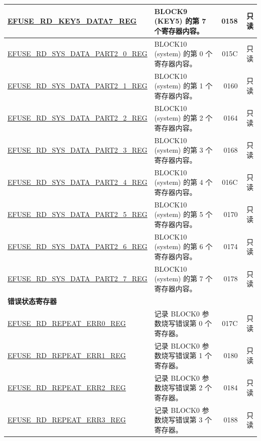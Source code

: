\begin{longtable}{ | m{6cm} |m{7.2cm} | r| r | }
\hyperref[regdesc:EFUSERDKEY5DATANREG]{EFUSE\_RD\_KEY5\_DATA7\_REG} & BLOCK9 (KEY5) 的第 7 个寄存器内容。 & \hexprefix{}0158 & 只读 \\ \hline
\hyperref[regdesc:EFUSERDSYSDATAPART2NREG]{EFUSE\_RD\_SYS\_DATA\_PART2\_0\_REG} & BLOCK10 (system) 的第 0 个寄存器内容。 & \hexprefix{}015C & 只读 \\ \hline
\hyperref[regdesc:EFUSERDSYSDATAPART2NREG]{EFUSE\_RD\_SYS\_DATA\_PART2\_1\_REG} & BLOCK10 (system) 的第 1 个寄存器内容。 & \hexprefix{}0160 & 只读 \\ \hline
\hyperref[regdesc:EFUSERDSYSDATAPART2NREG]{EFUSE\_RD\_SYS\_DATA\_PART2\_2\_REG} & BLOCK10 (system) 的第 2 个寄存器内容。 & \hexprefix{}0164 & 只读 \\ \hline
\hyperref[regdesc:EFUSERDSYSDATAPART2NREG]{EFUSE\_RD\_SYS\_DATA\_PART2\_3\_REG} & BLOCK10 (system) 的第 3 个寄存器内容。 & \hexprefix{}0168 & 只读 \\ \hline
\hyperref[regdesc:EFUSERDSYSDATAPART2NREG]{EFUSE\_RD\_SYS\_DATA\_PART2\_4\_REG} & BLOCK10 (system) 的第 4 个寄存器内容。 & \hexprefix{}016C & 只读 \\ \hline
\hyperref[regdesc:EFUSERDSYSDATAPART2NREG]{EFUSE\_RD\_SYS\_DATA\_PART2\_5\_REG} & BLOCK10 (system) 的第 5 个寄存器内容。 & \hexprefix{}0170 & 只读 \\ \hline
\hyperref[regdesc:EFUSERDSYSDATAPART2NREG]{EFUSE\_RD\_SYS\_DATA\_PART2\_6\_REG} & BLOCK10 (system) 的第 6 个寄存器内容。 & \hexprefix{}0174 & 只读 \\ \hline
\hyperref[regdesc:EFUSERDSYSDATAPART2NREG]{EFUSE\_RD\_SYS\_DATA\_PART2\_7\_REG} & BLOCK10 (system) 的第 7 个寄存器内容。 & \hexprefix{}0178 & 只读 \\ \hline
\multicolumn{4}{|l|}{\textbf{错误状态寄存器}} \\ \hline
\hyperref[regdesc:EFUSERDREPEATERR0REG]{EFUSE\_RD\_REPEAT\_ERR0\_REG} &记录 BLOCK0 参数烧写错误第 0 个寄存器。 & \hexprefix{}017C & 只读 \\ \hline
\hyperref[regdesc:EFUSERDREPEATERR1REG]{EFUSE\_RD\_REPEAT\_ERR1\_REG} &记录 BLOCK0 参数烧写错误第 1 个寄存器。 & \hexprefix{}0180 & 只读 \\ \hline
\hyperref[regdesc:EFUSERDREPEATERR2REG]{EFUSE\_RD\_REPEAT\_ERR2\_REG} & 记录 BLOCK0 参数烧写错误第 2 个寄存器。 & \hexprefix{}0184 & 只读 \\ \hline
\hyperref[regdesc:EFUSERDREPEATERR3REG]{EFUSE\_RD\_REPEAT\_ERR3\_REG} &记录 BLOCK0 参数烧写错误第 3 个寄存器。 & \hexprefix{}0188 & 只读 \\ \hline

\end{longtable}
